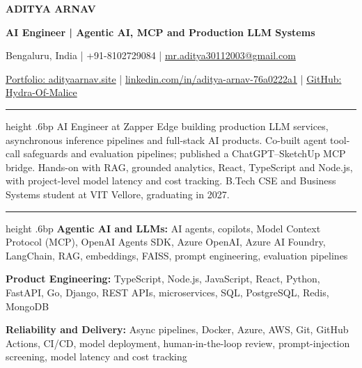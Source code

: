 \documentclass[10pt]{article}
\newcommand{\resumesection}[1]{\par\vspace{5.5bp}{\fontsize{10.56bp}{12.5bp}\selectfont\bfseries #1\par}\vspace{1bp}\hrule height .6bp\vspace{3bp}}
\begin{document}
\fontsize{10bp}{12bp}\selectfont
{\centering
{\fontsize{19bp}{22bp}\selectfont\bfseries ADITYA ARNAV\par}
\vspace{1bp}
{\fontsize{10.8bp}{13bp}\selectfont\bfseries AI Engineer | Agentic AI, MCP and Production LLM Systems\par}
\vspace{2bp}
{\fontsize{9bp}{11bp}\selectfont Bengaluru, India | +91-8102729084 | \href{mailto:mr.aditya30112003@gmail.com}{mr.aditya30112003@gmail.com}\par}
{\fontsize{9bp}{11bp}\selectfont \href{https://www.adityaarnav.site/}{Portfolio: adityaarnav.site} | \href{https://www.linkedin.com/in/aditya-arnav-76a0222a1}{linkedin.com/in/aditya-arnav-76a0222a1} | \href{https://github.com/Hydra-Of-Malice}{GitHub: Hydra-Of-Malice}\par}}

\resumesection{SUMMARY}
AI Engineer at Zapper Edge building production LLM services, asynchronous inference pipelines and full-stack AI products. Co-built agent tool-call safeguards and evaluation pipelines; published a ChatGPT--SketchUp MCP bridge. Hands-on with RAG, grounded analytics, React, TypeScript and Node.js, with project-level model latency and cost tracking. B.Tech CSE and Business Systems student at VIT Vellore, graduating in 2027.

\resumesection{TECHNICAL SKILLS}
\textbf{Agentic AI and LLMs:} AI agents, copilots, Model Context Protocol (MCP), OpenAI Agents SDK, Azure OpenAI, Azure AI Foundry, LangChain, RAG, embeddings, FAISS, prompt engineering, evaluation pipelines\par
\textbf{Product Engineering:} TypeScript, Node.js, JavaScript, React, Python, FastAPI, Go, Django, REST APIs, microservices, SQL, PostgreSQL, Redis, MongoDB\par
\textbf{Reliability and Delivery:} Async pipelines, Docker, Azure, AWS, Git, GitHub Actions, CI/CD, model deployment, human-in-the-loop review, prompt-injection screening, model latency and cost tracking
\end{document}
